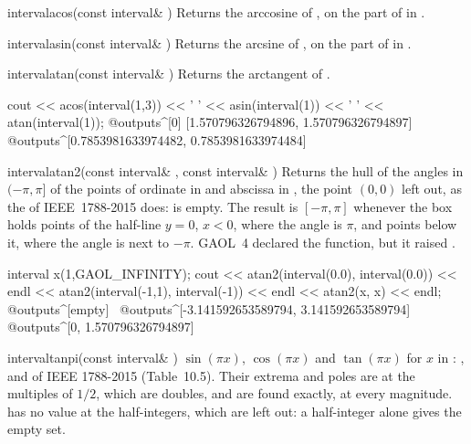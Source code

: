 \documentclass[12pt,a4paper,twoside,openright]{book}
\begin{document}
\begin{deffun}{interval}{acos}{(const interval\& )}
  Returns the arccosine of , on the part of  in .
\end{deffun}

\begin{deffun}{interval}{asin}{(const interval\& )}
  Returns the arcsine of , on the part of  in .
\end{deffun}

\begin{deffun}{interval}{atan}{(const interval\& )}
  Returns the arctangent of .
\begin{example}
cout << acos(interval(1,3)) << ' ' << asin(interval(1)) << ' '
     << atan(interval(1));
@outputs^[0] [1.570796326794896, 1.570796326794897]~
@outputs^[0.7853981633974482, 0.7853981633974484]~
\end{example}
\end{deffun}

\begin{deffun}{interval}{atan2}{(const interval\& , const interval\& )}
  Returns the hull of the angles in $(-\pi,\pi]$ of the points of ordinate
  in  and abscissa in , the point $(0,0)$ left out, as the
   of IEEE~1788-2015 does:  is empty. The
  result is $[-\pi,\pi]$ whenever the box holds points of the half-line
  $y=0$, $x<0$, where the angle is $\pi$, and points below it, where the
  angle is next to $-\pi$. GAOL~4 declared the function, but it raised
  .\newinvfive
\begin{example}
interval x(1,GAOL_INFINITY);
cout << atan2(interval(0.0), interval(0.0)) << endl
     << atan2(interval(-1,1), interval(-1)) << endl
     << atan2(x, x) << endl;
@outputs^[empty]~
@outputs^[-3.141592653589794, 3.141592653589794]~
@outputs^[0, 1.570796326794897]~
\end{example}
\end{deffun}

\begin{deffun}{interval}{tanpi}{(const interval\& )}
  $\sin(\pi x)$, $\cos(\pi x)$ and $\tan(\pi x)$ for $x$ in :
  ,  and  of IEEE 1788-2015
  (Table~10.5).\newinvfive{} Their extrema and poles are at the multiples of
  $1/2$, which are doubles, and are found exactly, at every magnitude.
   has no value at the half-integers, which are left out: a
  half-integer alone gives the empty set.
\end{deffun}
\end{document}

